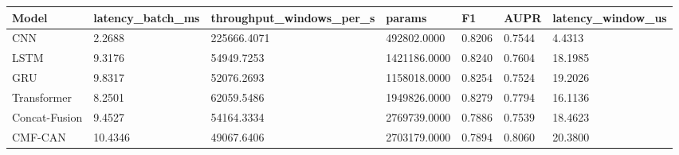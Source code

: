 \begin{tabular}{lllllll}
\toprule
Model & latency_batch_ms & throughput_windows_per_s & params & F1 & AUPR & latency_window_us \\
\midrule
CNN & 2.2688 & 225666.4071 & 492802.0000 & 0.8206 & 0.7544 & 4.4313 \\
LSTM & 9.3176 & 54949.7253 & 1421186.0000 & 0.8240 & 0.7604 & 18.1985 \\
GRU & 9.8317 & 52076.2693 & 1158018.0000 & 0.8254 & 0.7524 & 19.2026 \\
Transformer & 8.2501 & 62059.5486 & 1949826.0000 & 0.8279 & 0.7794 & 16.1136 \\
Concat-Fusion & 9.4527 & 54164.3334 & 2769739.0000 & 0.7886 & 0.7539 & 18.4623 \\
CMF-CAN & 10.4346 & 49067.6406 & 2703179.0000 & 0.7894 & 0.8060 & 20.3800 \\
\bottomrule
\end{tabular}

